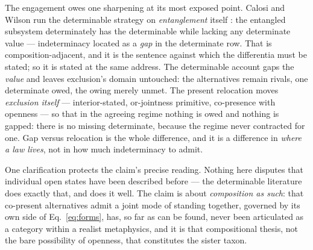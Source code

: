 \documentclass[11pt]{article}
\begin{document}
The engagement owes one sharpening at its most exposed point. Calosi and Wilson run the determinable strategy on \emph{entanglement} itself \cite{calosi2019}: the entangled subsystem determinately has the determinable while lacking any determinate value --- indeterminacy located as a \emph{gap} in the determinate row. That is composition-adjacent, and it is the sentence against which the differentia must be stated; so it is stated at the same address. The determinable account gaps the \emph{value} and leaves exclusion's domain untouched: the alternatives remain rivals, one determinate owed, the owing merely unmet. The present relocation moves \emph{exclusion itself} --- interior-stated, or-jointness primitive, co-presence with openness --- so that in the agreeing regime nothing is owed and nothing is gapped: there is no missing determinate, because the regime never contracted for one. Gap versus relocation is the whole difference, and it is a difference in \emph{where a law lives}, not in how much indeterminacy to admit.

One clarification protects the claim's precise reading. Nothing here disputes that individual open states have been described before --- the determinable literature does exactly that, and does it well. The claim is about \emph{composition as such}: that co-present alternatives admit a joint mode of standing together, governed by its own side of Eq.~\eqref{eq:forms}, has, so far as can be found, never been articulated as a category within a realist metaphysics, and it is that compositional thesis, not the bare possibility of openness, that constitutes the sister taxon.
\end{document}
